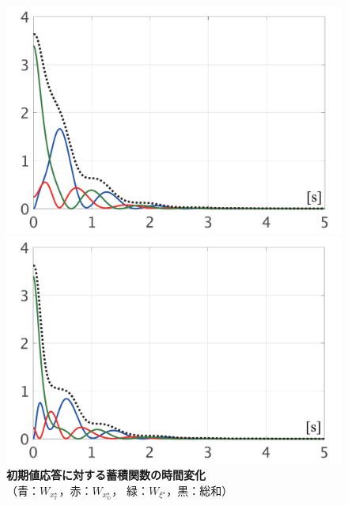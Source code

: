 \documentclass[tombow,dvipdfmx]{corona-a5-1.1}
\begin{document}
\begin{figure}[t]
  \centering
  {
  \begin{minipage}{0.49\linewidth}
    \centering
    \includegraphics[width = 1.0\linewidth]{figs/Wnlin1}
  \end{minipage}
  \begin{minipage}{0.49\linewidth}
    \centering
    \includegraphics[width = 1.0\linewidth]{figs/Wnlin2}
  \end{minipage}
  }
  \medskip
  \caption{\textbf{初期値応答に対する蓄積関数の時間変化}
  \\  \centering（青：$W_{x^{\star}_{\mathds{F}}}$，赤：$W_{x^{\star}_{\mathds{G}}}$，
  緑：$W_{\xi^{\star}}$，黒：総和）}
  \label{fig:LyapWnlin}
\medskip
\end{figure}
\end{document}
